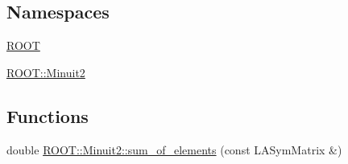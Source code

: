 \subsection*{Namespaces}
\begin{DoxyCompactItemize}
\item 
 \mbox{\hyperlink{namespaceROOT}{R\+O\+OT}}
\item 
 \mbox{\hyperlink{namespaceROOT_1_1Minuit2}{R\+O\+O\+T\+::\+Minuit2}}
\end{DoxyCompactItemize}
\subsection*{Functions}
\begin{DoxyCompactItemize}
\item 
double \mbox{\hyperlink{namespaceROOT_1_1Minuit2_a9beed1d87603a5fd4c04f65e1f7b7cf7}{R\+O\+O\+T\+::\+Minuit2\+::sum\+\_\+of\+\_\+elements}} (const L\+A\+Sym\+Matrix \&)
\end{DoxyCompactItemize}
